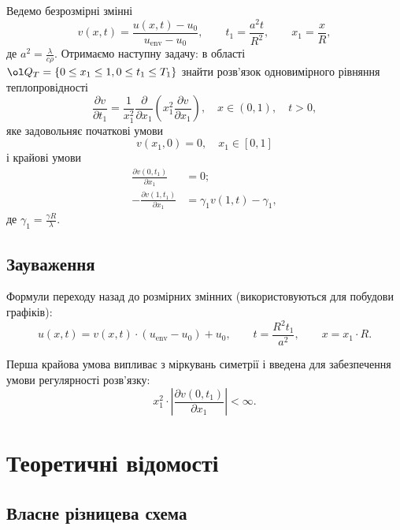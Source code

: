 Ведемо безрозмірні змінні
\begin{equation}
    v(x, t) = \frac{u(x, t) - u_0}{u_{\text{env}} - u_0}, \qquad t_1 = \frac{a^2 t}{R^2}, \qquad x_1 = \frac{x}{R},
\end{equation}
де $a^2 = \frac{\lambda}{c \rho}$. Отримаємо наступну задачу: в області $\ol Q_T = \{0 \le x_1 \le 1, 0 \le t_1 \le T_1\}$ знайти розв'язок одновимірного рівняння теплопровідності
\begin{equation}
    \frac{\partial v}{\partial t_1} = \frac{1}{x_1^2} \frac{\partial }{\partial x_1} \left( x_1^2 \frac{\partial v}{\partial x_1} \right), \quad x \in (0, 1), \quad t > 0,
\end{equation}
яке задовольняє початкові умови
\begin{equation}
    v(x_1, 0) = 0, \quad x_1 \in [0, 1]
\end{equation}
і крайові умови
\begin{equation}
    \begin{aligned}
        \frac{\partial v(0, t_1)}{\partial x_1} &= 0; \\
        -\frac{\partial v(1, t_1)}{\partial x_1} &= \gamma_1 v(1, t) - \gamma_1,
    \end{aligned}
\end{equation}
де $\gamma_1 = \frac{\gamma R}{\lambda}$.

\subsection{Зауваження}

Формули переходу назад до розмірних змінних (використовуються для побудови графіків):
\begin{equation}
    u(x, t) = v(x, t) \cdot (u_{\text{env}} - u_0) + u_0, \qquad t = \frac{R^2 t_1}{a^2}, \qquad x = x_1 \cdot R.
\end{equation}

Перша крайова умова випливає з міркувань симетрії і введена для забезпечення умови регулярності розв'язку:
\begin{equation}
    x_1^2 \cdot \left| \frac{\partial v(0, t_1)}{\partial x_1} \right| < \infty.
\end{equation}

\section{Теоретичні відомості}

\subsection{Власне різницева схема}

